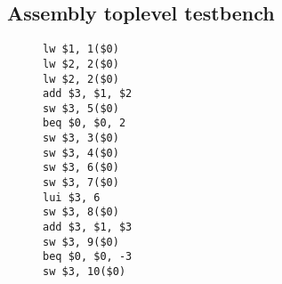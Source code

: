 \subsection{Assembly toplevel testbench}
\label{sec:assembly}
\begin{figure}[h]
\begin{verbatim}
lw $1, 1($0)
lw $2, 2($0)
lw $2, 2($0)
add $3, $1, $2
sw $3, 5($0)
beq $0, $0, 2
sw $3, 3($0)
sw $3, 4($0)
sw $3, 6($0)
sw $3, 7($0)
lui $3, 6
sw $3, 8($0)
add $3, $1, $3
sw $3, 9($0)
beq $0, $0, -3
sw $3, 10($0)
\end{verbatim}
\end{figure}
